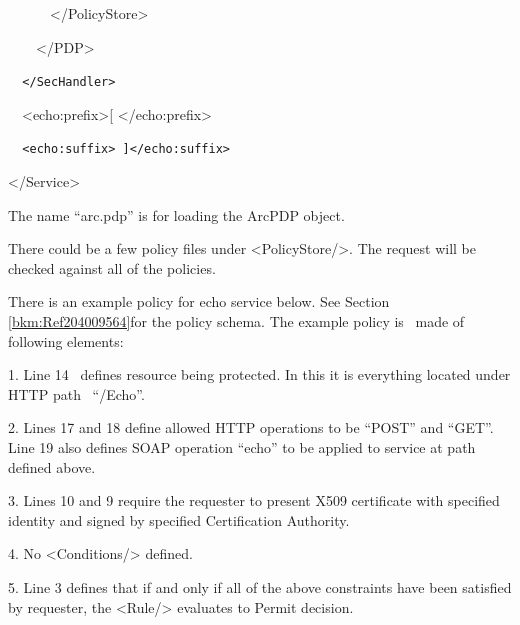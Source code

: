 \documentclass[a4paper]{article}
\begin{document}
{\ttfamily\color{black}
\ \ \ \ \ \ {\textless}/PolicyStore{\textgreater}}

{\ttfamily\color{black}
\ \ \ \ {\textless}/PDP{\textgreater}}

{\upshape\color{black}
\texttt{\ \ }\foreignlanguage{spanish}{\texttt{{\textless}/SecHandler{\textgreater}}}}

{\ttfamily\color{black}
\ \ {\textless}echo:prefix{\textgreater}[
{\textless}/echo:prefix{\textgreater}}

{\upshape\color{black}
\foreignlanguage{spanish}{\texttt{\ \ }}\texttt{{\textless}echo:suffix{\textgreater}
]{\textless}/echo:suffix{\textgreater}}}

{\ttfamily\color{black}
{\textless}/Service{\textgreater}}

{\color{black}
The name {\textquotedblleft}arc.pdp{\textquotedblright} is for loading
the ArcPDP object.}

{\color{black}
There could be a few policy files under
{\textless}PolicyStore/{\textgreater}. The request will be checked
against all of the policies.}

{\upshape\color{black}
There is an example policy for echo service below. See Section
\ref{bkm:Ref204009564}for the policy schema. The example policy is
\ made of following elements: }

{\color{black}
1. Line 14 \ defines resource being protected. In this it is everything
located under HTTP path
\ {\textquotedblleft}/Echo{\textquotedblright}.}

{\color{black}
2. Lines 17 and 18 define allowed HTTP operations to be
{\textquotedblleft}POST{\textquotedblright} and
{\textquotedblleft}GET{\textquotedblright}. Line 19 also defines SOAP
operation {\textquotedblleft}echo{\textquotedblright} to be applied to
service at path defined above.}

{\color{black}
3. Lines 10 and 9 require the requester to present X509 certificate with
specified identity and signed by specified Certification Authority.}

{\color{black}
4. No {\textless}Conditions/{\textgreater} defined.}

{\color{black}
5. Line 3 defines that if and only if all of the above constraints have
been satisfied by requester, the {\textless}Rule/{\textgreater}
evaluates to Permit decision.}
\end{document}
